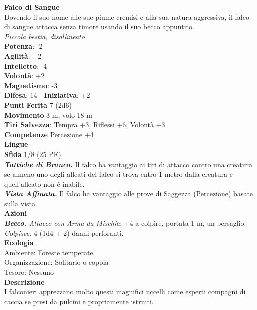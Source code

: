 \begin{multicols}{2}
\medskip\textbf{Falco di Sangue}\\
Dovendo il suo nome alle sue piume cremisi e alla sua natura aggressiva, il falco di sangue attacca senza timore usando il suo becco appuntito.\\
\emph{Piccola bestia, disallineato}\\
\textbf{Potenza}: -2\\
\textbf{Agilità}: +2\\
\textbf{Intelletto}: -4\\
\textbf{Volontà}: +2\\
\textbf{Magnetismo}: -3\\
\textbf{Difesa}: 14 - \textbf{Iniziativa}: +2\\
\textbf{Punti Ferita} 7 (2d6)\\
\textbf{Movimento} 3 m, volo 18 m\\
\textbf{Tiri Salvezza}: Tempra +3, Riflessi +6, Volontà +3 \\
\textbf{Competenze} Percezione +4\\
\textbf{Lingue} -\\
\textbf{Sfida} 1/8 (25 PE)\smallskip\\
\emph{\textbf{Tattiche di Branco.}} Il falco ha vantaggio ai tiri di attacco contro una creatura se almeno uno degli alleati del falco si trova entro 1 metro dalla creatura e quell'alleato non è inabile.\\
\emph{\textbf{Vista Affinata.}} Il falco ha vantaggio alle prove di Saggezza (Percezione) basate sulla vista.\\
\smallskip\textbf{Azioni}\\
\emph{\textbf{Becco.} Attacco con Arma da Mischia}: +4 a colpire, portata 1 m, un bersaglio.\\
\emph{Colpisce:} 4 (1d4 + 2) danni perforanti.\\
\textbf{Ecologia}\\
Ambiente: Foreste temperate\\
Organizzazione: Solitario o coppia\\
Tesoro: Nessuno\\
\textbf{Descrizione}\\
I falconieri apprezzano molto questi magnifici uccelli come esperti compagni di caccia se presi da pulcini e propriamente istruiti. \\



\end{multicols}
